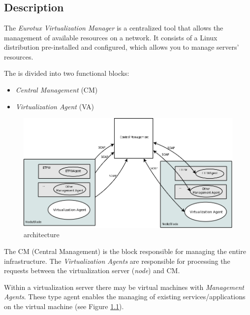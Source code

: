 \chapter{\textsf{\acronym}}
\section*{Description}
The \emph{Eurotux Virtualization Manager} is a centralized tool that allows the management of available resources on a network. It consists of a Linux distribution pre-installed and configured, which allows you to manage servers' resources.

The \acronym is divided into two functional blocks:

\begin{itemize}
	\item \emph{Central Management} (CM)
    \item \emph{Virtualization Agent} (VA)
\end{itemize}

\begin{figure}[H]
	\begin{center}
	\includegraphics[scale=0.35]{screenshots/etva_blocos.png}
	\caption{\acronym architecture}
	\label{fig:etva_blocos}
	\end{center}
\end{figure}

The CM (Central Management) is the block responsible for managing the entire infrastructure.
The \emph{Virtualization Agents} are responsible for processing the requests between the virtualization server (\emph{node}) and CM.

Within a virtualization server there may be virtual machines with \emph{Management Agents}. These type agent enables the managing of existing services/applications on the virtual machine (see Figure \ref{fig:etva_blocos}).

